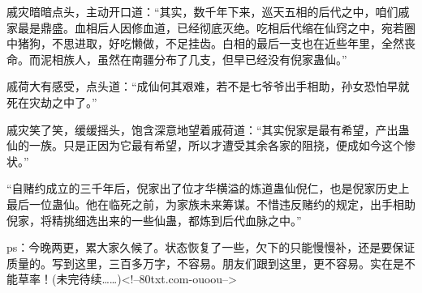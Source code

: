 \begin{this_body}
戚灾暗暗点头，主动开口道：“其实，数千年下来，巡天五相的后代之中，咱们戚家最是鼎盛。血相后人因修血道，已经彻底灭绝。吃相后代缩在仙窍之中，宛若圈中猪狗，不思进取，好吃懒做，不足挂齿。白相的最后一支也在近些年里，全然丧命。而泥相族人，虽然在南疆分布了几支，但早已经没有倪家蛊仙。”

戚荷大有感受，点头道：“成仙何其艰难，若不是七爷爷出手相助，孙女恐怕早就死在灾劫之中了。”

戚灾笑了笑，缓缓摇头，饱含深意地望着戚荷道：“其实倪家是最有希望，产出蛊仙的一族。只是正因为它最有希望，所以才遭受其余各家的阻挠，便成如今这个惨状。”

“自赌约成立的三千年后，倪家出了位才华横溢的炼道蛊仙倪仁，也是倪家历史上最后一位蛊仙。他在临死之前，为家族未来筹谋。不惜违反赌约的规定，出手相助倪家，将精挑细选出来的一些仙蛊，都炼到后代血脉之中。”

ps：今晚两更，累大家久候了。状态恢复了一些，欠下的只能慢慢补，还是要保证质量的。写到这里，三百多万字，不容易。朋友们跟到这里，更不容易。实在是不能草率！(未完待续……)<!--80txt.com-ouoou-->

\end{this_body}

